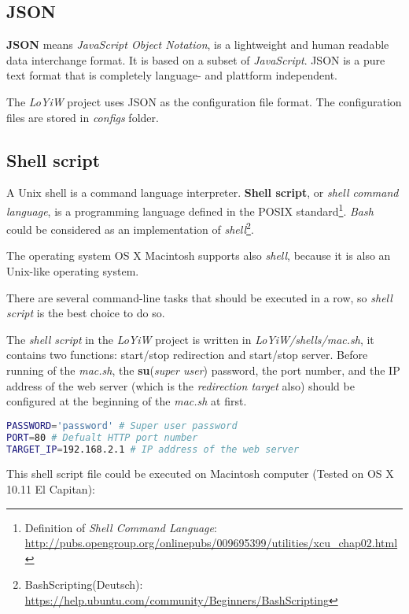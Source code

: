 \subsection{JSON}
\textbf{JSON} means \textit{JavaScript Object Notation}, is a lightweight and human readable data interchange format. It is based on a subset of \textit{JavaScript}. JSON is a pure text format that is completely language- and plattform independent.

The \textit{LoYiW} project uses JSON as the configuration file format. The configuration files are stored in \textit{configs} folder.

\subsection{Shell script}

A Unix shell is a command language interpreter. \textbf{Shell script}, or \textit{shell command language}, is a programming language defined in the POSIX standard\footnote{Definition of \textit{Shell Command Language}: \url{http://pubs.opengroup.org/onlinepubs/009695399/utilities/xcu_chap02.html}}. \textit{Bash} could be considered as an implementation of \textit{shell}\footnote{BashScripting(Deutsch): \url{https://help.ubuntu.com/community/Beginners/BashScripting}}.

The operating system OS X Macintosh supports also \textit{shell}, because it is also an Unix-like operating system.

There are several command-line tasks that should be executed in a row, so \textit{shell script} is the best choice to do so.

The \textit{shell script} in the \textit{LoYiW} project is written in \textit{LoYiW/shells/mac.sh}, it contains two functions: start/stop redirection and start/stop server. Before running of the \textit{mac.sh}, the \textbf{su}(\textit{super user}) password, the port number, and the IP address of the web server (which is the \textit{redirection target} also) should be configured at the beginning of the \textit{mac.sh} at first.

\begin{lstlisting}[language=bash, caption={Configurations sample in mac.sh}]
PASSWORD='password' # Super user password
PORT=80 # Defualt HTTP port number
TARGET_IP=192.168.2.1 # IP address of the web server
\end{lstlisting} 

This shell script file could be executed on Macintosh computer (Tested on OS X 10.11 El Capitan):

